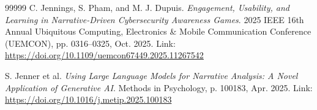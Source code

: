 \documentclass[12pt,a4paper]{report}
\begin{document}
\begin{thebibliography}{99999}
 C. Jennings, S. Pham, and M. J. Dupuis. \textit{Engagement, Usability, and Learning in Narrative-Driven Cybersecurity Awareness Games}. 2025 IEEE 16th Annual Ubiquitous Computing, Electronics \& Mobile Communication Conference (UEMCON), pp. 0316–0325, Oct. 2025. Link: \url{https://doi.org/10.1109/uemcon67449.2025.11267542}

 S. Jenner et al. \textit{Using Large Language Models for Narrative Analysis: A Novel Application of Generative AI}. Methods in Psychology, p. 100183, Apr. 2025. Link: \url{https://doi.org/10.1016/j.metip.2025.100183}

\end{thebibliography}
\end{document}
